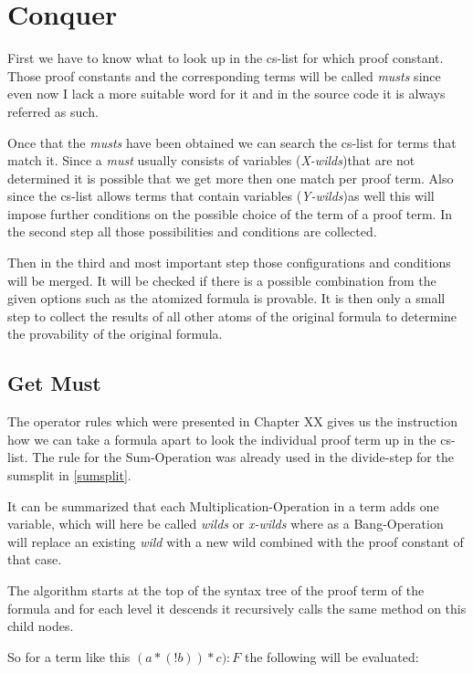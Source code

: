 \section{Conquer}
First we have to know what to look up in the cs-list for which proof constant. Those proof constants and the corresponding terms will be called \emph{musts} since even now I lack a more suitable word for it and in the source code it is always referred as such.

Once that the \emph{musts} have been obtained we can search the cs-list for terms that match it. Since a \emph{must} usually consists of variables (\emph{X-wilds})that are not determined it is possible that we get more then one match per proof term. Also since the cs-list allows terms that contain variables (\emph{Y-wilds})as well this will impose further conditions on the possible choice of the term of a proof term. In the second step all those possibilities and conditions are collected.

Then in the third and most important step those configurations and conditions will be merged. It will be checked if there is a possible combination from the given options such as the atomized formula is provable. It is then only a small step to collect the results of all other atoms of the original formula to determine the provability of the original formula. 

\subsection{Get Must}
The operator rules which were presented in Chapter XX gives us the instruction how we can take a formula apart to look the individual proof term up in the cs-list. The rule for the Sum-Operation was already used in the divide-step for the sumsplit in \ref{sumsplit}.

It can be summarized that each Multiplication-Operation in a term adds one variable, which will here be called \emph{wilds} or \emph{x-wilds} where as a Bang-Operation will replace an existing \emph{wild} with a new wild combined with the proof constant of that case. 

The algorithm starts at the top of the syntax tree of the proof term of the formula and for each level it descends it recursively calls the same method on this child nodes.

So for a term like this $(a*(!b))*c):F$ the following will be evaluated:

